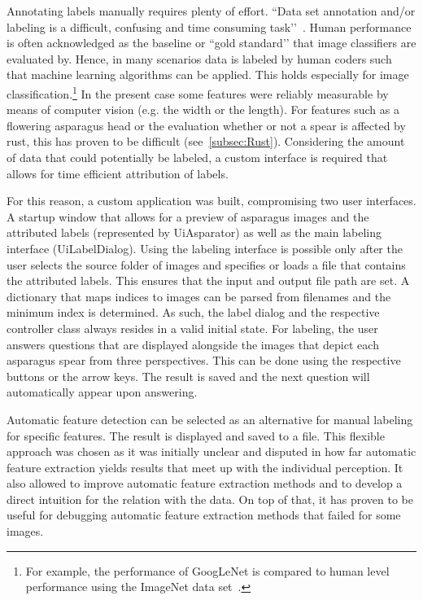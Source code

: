 Annotating labels manually requires plenty of effort. ``Data set annotation and/or labeling is a difficult, confusing and time consuming task’’~\citep{al2018labeling}. Human performance is often acknowledged as the baseline or ``gold standard’’ that image classifiers are evaluated by. Hence, in many scenarios data is labeled by human coders such that machine learning algorithms can be applied. This holds especially for image classification.\footnote{For example, the performance of GoogLeNet is compared to human level performance using the ImageNet data set~\citep{russakovsky2015imagenet}.} In the present case some features were reliably measurable by means of computer vision (e.g. the width or the length). For features such as a flowering asparagus head or the evaluation whether or not a spear is affected by rust, this has proven to be difficult (see~\autoref{subsec:Rust}). Considering the amount of data that could potentially be labeled, a custom interface is required that allows for time efficient attribution of labels.

For this reason, a custom application was built, compromising two user interfaces. A startup window that allows for a preview of asparagus images and the attributed labels (represented by Ui\textunderscore Asparator) as well as the main labeling interface (Ui\textunderscore LabelDialog). Using the labeling interface is possible only after the user selects the source folder of images and specifies or loads a file that contains the attributed labels. This ensures that the input and output file path are set. A dictionary that maps indices to images can be parsed from filenames and the minimum index is determined. As such, the label dialog and the respective controller class always resides in a valid initial state. For labeling, the user answers questions that are displayed alongside the images that depict each asparagus spear from three perspectives. This can be done using the respective buttons or the arrow keys. The result is saved and the next question will automatically appear upon answering. 

Automatic feature detection can be selected as an alternative for manual labeling for specific features. The result is displayed and saved to a file. This flexible approach was chosen as it was initially unclear and disputed in how far automatic feature extraction yields results that meet up with the individual perception. It also allowed to improve automatic feature extraction methods and to develop a direct intuition for the relation with the data. On top of that, it has proven to be useful for debugging automatic feature extraction methods that failed for some images.

